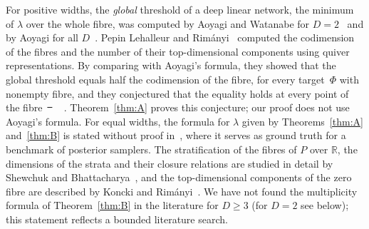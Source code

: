 \documentclass[11pt,a4paper]{article}
\theoremstyle{definition}
\theoremstyle{remark}
\numberwithin{equation}{section}
\newcommand{\R}{\mathbb{R}}
\providecommand{\DIFaddtex}[1]{{\protect\color{blue}#1}} %
\providecommand{\DIFdeltex}[1]{{\protect\color{red}\sout{#1}}} %
\providecommand{\DIFaddbegin}{} %
\providecommand{\DIFaddend}{} %
\providecommand{\DIFdelbegin}{} %
\providecommand{\DIFdelend}{} %
\providecommand{\DIFadd}[1]{\texorpdfstring{\DIFaddtex{#1}}{#1}} %
\providecommand{\DIFdel}[1]{\texorpdfstring{\DIFdeltex{#1}}{}} %
\begin{document}
For positive widths, the \emph{global} threshold of a deep linear network, the minimum of $\lambda$ over the whole fibre, was computed by Aoyagi and Watanabe for $D=2$~\cite{aoyagi-watanabe} and by Aoyagi for all $D$~\cite{aoyagi-2024}. Pepin Lehalleur and Rimányi~\cite{lehalleur-rimanyi} computed the codimension of the fibres and the number of their top-dimensional components using quiver representations. By comparing with Aoyagi's formula, they showed that the global threshold equals half the codimension of the fibre, for every target~$\Phi$ with nonempty fibre, and they conjectured that the equality holds at every point of the fibre~\DIFdelbegin \DIFdel{\mbox{%
\cite[Remark~8.7]{lehalleur-rimanyi}}\hskip0pt%
}\DIFdelend \DIFaddbegin \DIFadd{\mbox{%
\cite[Section~8]{lehalleur-rimanyi}}\hskip0pt%
}\DIFaddend . Theorem~\ref{thm:A} proves this conjecture; our proof does not use Aoyagi's formula. For equal widths, the formula for $\lambda$ given by Theorems~\ref{thm:A} and~\ref{thm:B} is stated without proof in~\cite[Appendix~B, Theorem~B.5]{hitchcock-hoogland}, where it serves as ground truth for a benchmark of posterior samplers. The stratification of the fibres of $P$ over $\R$, the dimensions of the strata and their closure relations are studied in detail by Shewchuk and Bhattacharya~\cite{shewchuk-bhattacharya}, and the top-dimensional components of the zero fibre are described by Koncki and Rimányi~\cite{koncki-rimanyi}. We have not found the multiplicity formula of Theorem~\ref{thm:B} in the literature for $D\ge3$ (for $D=2$ see below); this statement reflects a bounded literature search.
\end{document}
